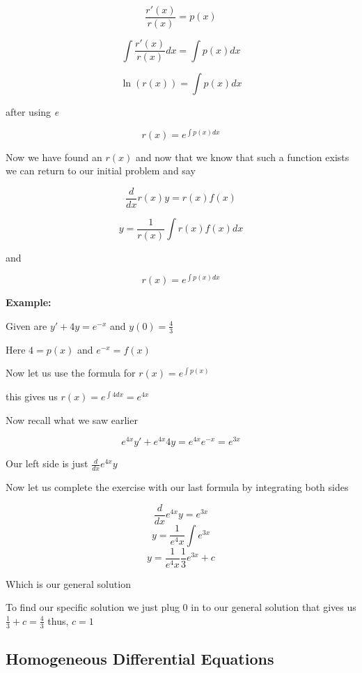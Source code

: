 \[
    \frac{r'(x)}{r(x)} = p(x)
\]

\[
    \int \frac{r'(x)}{r(x)}dx = \int p(x)dx
\]

\[
    \ln(r(x)) = \int p(x) dx
\]

after using \emph{e}

\[ 
    r(x) = e^{\int p(x) dx}
\]

Now we have found an \(r(x)\) and now that we know that such a function exists we can return 
to our initial problem and say

\[
    \frac{d}{dx}r(x)y = r(x)f(x)
\]

\[
    y = \frac{1}{r (x) } \int r (x) f (x) dx
\]

and 

\[
    r(x) = e^{\int p (x) dx}
\]

\textbf{Example:}
\vspace{\baselineskip}


Given are \(y' + 4y = e^{-x}\) and \(y(0) = \frac{4}{3}\)
\vspace{\baselineskip}

Here \(4 = p(x)\) and \(e^{-x} = f(x)\)
\vspace{\baselineskip}

Now let us use the formula for \(r(x) = e^{\int p (x)}\)
\vspace{\baselineskip}

this gives us \(r(x) = e^{\int 4dx} = e^{4x}\)
\vspace{\baselineskip}

Now recall what we saw earlier

\[
    e^{4x}y' + e^{4x}4y = e^{4x}e^{-x} = e^{3x}
\]

Our left side is just \(\frac{d}{dx} e^{4x}y\)
\vspace{\baselineskip}

Now let us complete the exercise with our last formula by integrating both sides

\[
    \frac{d}{dx} e^{4x}y = e^{3x}
\]
\[
    y = \frac{1}{e^4x}\int e^{3x}
\]
\[
    y = \frac{1}{e^4x} \frac{1}{3}e^{3x} + c
\]

Which is our general solution
\vspace{\baselineskip}

To find our specific solution we just plug 0 in to our general solution that gives us
\(\frac{1}{3} + c = \frac{4}{3}\) thus, \(c = 1\)

\subsection{Homogeneous Differential Equations}

